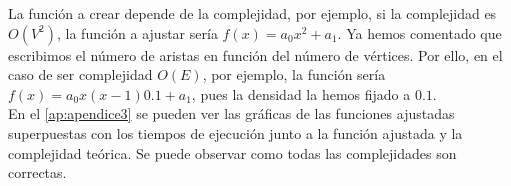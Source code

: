 La función a crear depende de la complejidad, por ejemplo, si la complejidad es $O(V^2)$, la función a ajustar sería $f(x) = a_0x^2 + a_1$. Ya hemos comentado que escribimos el número de aristas en función del número de vértices. Por ello, en el caso de ser complejidad $O(E)$, por ejemplo, la función sería $f(x) = a_0x(x-1)0.1 + a_1$, pues la densidad la hemos fijado a $0.1$. \\ 

En el \autoref{ap:apendice3} se pueden ver las gráficas de las funciones ajustadas superpuestas con los tiempos de ejecución junto a la función ajustada y la complejidad teórica. Se puede observar como todas las complejidades son correctas.



\endinput




